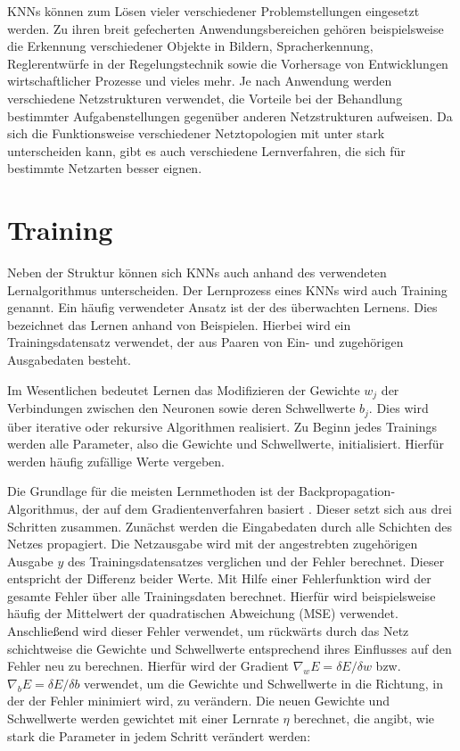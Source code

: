 KNNs können zum Lösen vieler verschiedener Problemstellungen eingesetzt werden. Zu ihren breit gefecherten Anwendungsbereichen gehören beispielsweise die Erkennung verschiedener Objekte in Bildern,   Spracherkennung, Reglerentwürfe in der Re\-gel\-ungs\-tech\-nik sowie die Vorhersage von Entwicklungen wirtschaftlicher Prozesse und vieles mehr. Je nach Anwendung werden verschiedene Netzstrukturen verwendet, die Vorteile bei der Behandlung bestimmter Aufgabenstellungen gegenüber anderen Netzstrukturen aufweisen. Da sich die Funktionsweise verschiedener Netztopologien mit unter stark unterscheiden kann, gibt es auch verschiedene Lernverfahren, die sich für bestimmte Netzarten besser eignen. 

\section[Training (Schmelzer)]{Training}
\label{sec:training}

Neben der Struktur können sich KNNs auch anhand des verwendeten Lernalgorithmus unterscheiden. Der Lernprozess eines KNNs wird auch Training genannt. Ein häufig verwendeter Ansatz ist der des überwachten Lernens. Dies bezeichnet das Lernen anhand von Beispielen. Hierbei wird ein Trainingsdatensatz verwendet, der aus Paaren von Ein- und zugehörigen Ausgabedaten besteht.

Im Wesentlichen bedeutet Lernen das Modifizieren der Gewichte $ w_j $ der Ver\-bin\-dung\-en zwischen den Neuronen sowie deren Schwellwerte $ b_j $. Dies wird über iterative oder rekursive Algorithmen realisiert. Zu Beginn jedes Trainings werden alle Parameter, also die Gewichte und Schwellwerte, initialisiert. Hierfür werden häufig zufällige Werte vergeben. 

Die Grundlage für die meisten Lernmethoden ist der Backpropagation-Algorithmus, der auf dem Gradientenverfahren basiert \cite{Goodfellow2016}. Dieser setzt sich aus drei Schritten zusammen. Zunächst werden die Eingabedaten durch alle Schichten des Netzes propagiert. Die Netz\-aus\-gabe wird mit der angestrebten zugehörigen Ausgabe $ y $ des Trainingsdatensatzes verglichen und der Fehler berechnet. Dieser entspricht der Differenz beider Werte. Mit Hilfe einer Fehlerfunktion wird der gesamte Fehler über alle Trainingsdaten berechnet. Hierfür wird beispielsweise häufig der Mittelwert der quadratischen Abweichung (MSE) verwendet. Anschließend wird dieser Fehler verwendet, um rückwärts durch das Netz schichtweise die Gewichte und Schwellwerte entsprechend ihres Einflusses auf den Fehler neu zu berechnen. Hierfür wird der Gradient $ \nabla_w E = \delta E/\delta w $ bzw. $ \nabla_b E = \delta E/\delta b $ verwendet, um die Gewichte und Schwellwerte in die Richtung, in der der Fehler minimiert wird, zu verändern. Die neuen Gewichte und Schwellwerte werden gewichtet mit einer Lernrate $ \eta $ berechnet, die angibt, wie stark die Parameter in jedem Schritt verändert werden:

